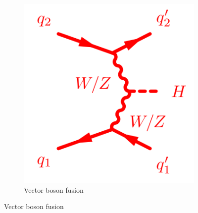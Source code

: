 \begin{figure}
\begin{subfigure}[b]{0.3\textwidth}
                \includegraphics[width=\textwidth]{1_Introduction_Th_and_Exp/pics/BosonFusion.png}
                \caption{Vector boson fusion}
                \label{fig:vbf}
        \end{subfigure}


\end{figure}
